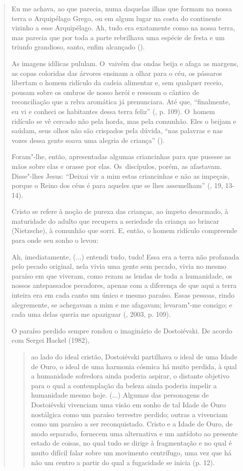 {\begin{quote}
Eu me achava, ao que parecia, numa daquelas ilhas que formam na nossa
terra o Arquipélago Grego, ou em algum lugar na costa do continente
vizinho a esse Arquipélago. Ah, tudo era exatamente como na nossa terra,
mas parecia que por toda a parte rebrilhava uma espécie de festa e um
triunfo grandioso, santo, enfim alcançado ().

As imagens idílicas pululam. O~vaivém das ondas beija e afaga as
margens, as copas coloridas das árvores ensinam a olhar para o céu, os
pássaros libertam o homem ridículo da cadeia alimentar e, sem qualquer
receio, pousam sobre os ombros de nosso herói e ressoam o cântico de
reconciliação que a relva aromática já prenunciara. Até que,
``finalmente, eu vi e conheci os habitantes dessa terra feliz'' (,
p. 109). O~homem ridículo se vê cercado não pela horda, mas pela
comunhão. Eles o beijam e saúdam, seus olhos não são crispados pela
dúvida, ``nas palavras e nas vozes dessa gente soava uma alegria de
criança'' ().

Foram"-lhe, então, apresentadas algumas criancinhas para que pusesse as
mãos sobre elas e orasse por elas. Os~discípulos, porém, as afastavam.
Disse"-lhes Jesus: ``Deixai vir a mim estas criancinhas e não as
impeçais, porque o Reino dos céus é para aqueles que se lhes
assemelham'' (, 19, 13-14).

Cristo se refere à noção de pureza das crianças, ao ímpeto desarmado, à
maturidade do adulto que recupera a seriedade da criança ao brincar
(Nietzsche), à comunhão que sorri. E, então, o homem ridículo compreende
para onde seu sonho o levou:

Ah, imediatamente, (...) entendi tudo, tudo! Essa era a terra não
profanada pelo pecado original, nela vivia uma gente sem pecado, vivia
no mesmo paraíso em que viveram, como rezam as lendas de toda a
humanidade, os nossos antepassados pecadores, apenas com a diferença de
que aqui a terra inteira era em cada canto um único e mesmo paraíso.
Essas pessoas, rindo alegremente, se achegavam a mim e me afagavam;
levaram"-me consigo; e cada uma delas queria me apaziguar (,
2003, p. 109).

O paraíso perdido sempre rondou o imaginário de Dostoiévski. De acordo
com Sergei Hackel (1982),

\begin{quote}
ao lado do ideal cristão, Dostoiévski partilhava o ideal de uma Idade de
Ouro, o ideal de uma harmonia cósmica há muito perdida, à qual a
humanidade sofredora ainda poderia aspirar, o distante objetivo para o
qual a contemplação da beleza ainda poderia impelir a humanidade mesmo
hoje. (...) Algumas das personagens de Dostoiévski vivenciam uma visão
em sonho de tal Idade de Ouro nostálgica como um paraíso terrestre
perdido; outras a vivenciam como um paraíso a ser reconquistado. Cristo
e a Idade de Ouro, de modo separado, fornecem uma alternativa e um
antídoto ao presente estado de coisas, no qual tudo se dirige à
fragmentação e no qual é muito difícil falar sobre um movimento
centrífugo, uma vez que há não um centro a partir do qual a fugacidade
se inicia (p. 12).
\end{quote}


\end{quote}}
